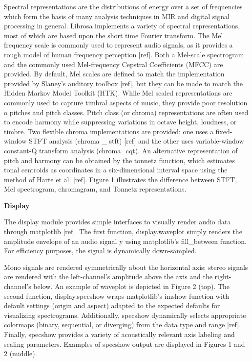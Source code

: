 Spectral representations are the distributions of energy over a set of frequencies which form the basis of many analysis techniques in MIR and digital signal processing in general. Librosa implements a variety of spectral representations, most of which are based upon the short \space time Fourier transform. The Mel frequency scale is commonly used to represent audio signals, as it provides a rough model of human frequency perception [ref]. Both a Mel-scale spectrogram and the commonly used Mel-frequency Cepstral Coefficients (MFCC) are provided. By default, Mel scales are defined to match the implementation provided by Slaney’s auditory toolbox [ref], but they can be made to match the Hidden Markov Model Toolkit (HTK). While Mel \space scaled representations are commonly used to capture timbral aspects of music, they provide poor resolution o pitches and pitch classes. Pitch class (or chroma) representations are often used to encode harmony while suppressing variations in octave height, loudness, or timbre. Two flexible chroma implementations are provided: one uses a fixed-window STFT analysis (chroma \_ stft) [ref] and the other uses variable-window constant-Q transform analysis (chroma\_cqt). An alternative representation of pitch and harmony can be obtained by the tonnetz function, which estimates tonal centroids as coordinates in a six-dimensional interval space using the method of Harte et \space al. [ref]. Figure 1 illustrates the difference between STFT, Mel spectrogram, chromagram, and Tonnetz representations.

\begin{flushleft}
  \textbf{Display}
\end{flushleft}

The display module provides simple interfaces to visually render audio data through matplotlib [ref]. The first function, display.waveplot simply renders the amplitude envelope of an audio signal y using matplotlib’s fill\_between function. For efficiency purposes, the signal is dynamically down-sampled.
\par
Mono signals are rendered symmetrically about the horizontal axis; stereo signals are rendered with the left-channel’s amplitude above the axis and the right-channel’s below. An example of waveplot is depicted in Figure 2 (top). The second function, display.specshow wraps matplotlib’s imshow function with default settings (origin and aspect) adapted to the expected defaults for visualizing spectrograms. Additionally, specshow dynamically selects appropriate colormaps (binary, sequential, or diverging) from the data type and range [ref]. Finally, specshow provides a variety of acoustically relevant axis labeling and scaling parameters. Examples of specshow output are displayed in Figures 1 and 2 (middle). 
